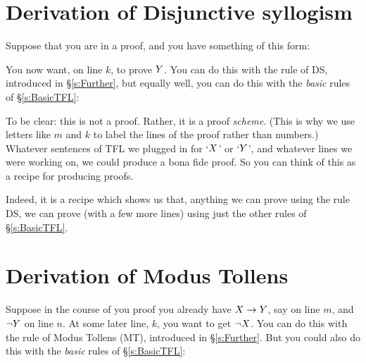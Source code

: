\section{Derivation of Disjunctive syllogism}
Suppose that you are in a proof, and you have something of this form:
\begin{fitchproof}
\end{fitchproof}
You now want, on line $k$, to prove $Y$. You can do this with the rule of DS, introduced in \S\ref{s:Further}, but equally well, you can do this with the \emph{basic} rules of \S\ref{s:BasicTFL}:
	\begin{fitchproof}
		\open
			\open
			\close
		\close
		\open
		\close
\end{fitchproof}

To be clear: this is not a proof. Rather, it is a proof \emph{scheme}.
(This is why we use letters like $m$ and $k$ to label the lines of the proof rather than numbers.)
Whatever sentences of TFL we plugged in for `$X$' or `$Y$', and whatever lines we were working on, we could produce a bona fide proof. So you can think of this as a recipe for producing proofs.

Indeed, it is a recipe which shows us that, anything we can prove using the rule DS, we can prove (with a few more lines) using just the other rules of \S\ref{s:BasicTFL}.
%

\section{Derivation of Modus Tollens}
Suppose in the course of you proof you already have $X\rightarrow Y$, say on line $m$, and $\neg Y$ on line $n$. At some later line, $k$, you want to get $\neg X$.
 You can do this with the rule of Modus Tollens (MT), introduced in \S\ref{s:Further}. But you could also do this with the \emph{basic} rules of \S\ref{s:BasicTFL}:

